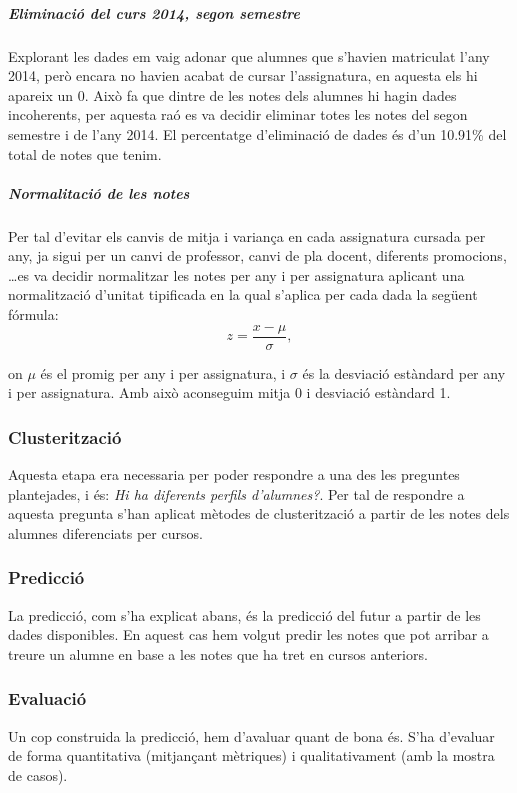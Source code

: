 \documentclass[12pt,a4paper,catalan]{article}
\begin{document}
\subparagraph{Eliminació del curs 2014, segon semestre}
Explorant les dades em vaig adonar que alumnes que s'havien matriculat l'any 2014, però encara no havien acabat de cursar l'assignatura, en aquesta els hi apareix un 0. Això fa que dintre de les notes dels alumnes hi hagin dades incoherents, per aquesta raó es va decidir eliminar totes les notes del segon semestre i de l'any 2014. El percentatge d'eliminació de dades és d'un 10.91\% del total de notes que tenim.

\subparagraph{Normalitació de les notes}
Per tal d'evitar els canvis de mitja i variança en cada assignatura cursada per any, ja sigui per un canvi de professor, canvi de pla docent, diferents promocions, \ldots es va decidir normalitzar les notes per any i per assignatura aplicant una normalització d'unitat tipificada \cite{normtipificada} en la qual s'aplica per cada dada la següent fórmula:
$$ z = \frac{x - \mu}{\sigma}, $$

on $\mu$ és el promig per any i per assignatura, i $\sigma$ és la desviació estàndard per any i per assignatura. Amb això aconseguim mitja 0 i desviació estàndard 1.

\subsubsection{Clusterització}
Aquesta etapa era necessaria per poder respondre a una des les preguntes plantejades, i és: \textit{Hi ha diferents perfils d'alumnes?}. Per tal de  respondre a aquesta pregunta s'han aplicat mètodes de clusterització a partir de les notes dels alumnes diferenciats per cursos.

\subsubsection{Predicció}
La predicció, com s'ha explicat abans, és la predicció del futur a partir de les dades disponibles. En aquest cas hem volgut predir les notes que pot arribar a treure un alumne en base a les notes que ha tret en cursos anteriors.

\subsubsection{Evaluació}
Un cop construida la predicció, hem d'avaluar quant de bona és. S'ha d'evaluar de forma quantitativa (mitjançant mètriques) i qualitativament (amb la mostra de casos).

\newpage
\end{document}
